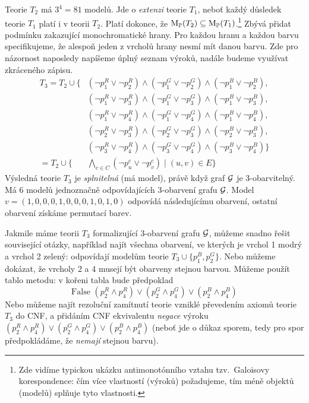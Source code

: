 Teorie \( T_2 \) má \(3^4=81\) modelů. Jde o \emph{extenzi} teorie \( T_1 \), neboť každý důsledek teorie \( T_1 \) platí i v teorii \( T_2 \). Platí dokonce, že \( \operatorname{M}_\mathbb P(T_2)\subseteq\operatorname{M}_\mathbb P(T_1) \).\footnote{Zde vidíme typickou ukázku antimonotónního vztahu tzv.\ Galoisovy korespondence: čím více vlastností (výroků) požadujeme, tím méně objektů (modelů) splňuje tyto vlastnosti.} Zbývá přidat podmínku zakazující monochromatické hrany. Pro každou hranu a každou barvu specifikujeme, že alespoň jeden z vrcholů hrany nesmí mít danou barvu. Zde pro názornost naposledy napíšeme úplný seznam výroků, nadále budeme využívat zkráceného zápisu.
\begin{align*}
    T_3 = T_2\cup \{ & (\neg p_1^R \lor \neg p_2^R) \land (\neg p_1^G \lor \neg p_2^G) \land (\neg p_1^B \lor \neg p_2^B),\\
    & (\neg p_1^R \lor \neg p_3^R) \land (\neg p_1^G \lor \neg p_3^G) \land (\neg p_1^B \lor \neg p_3^B),\\
    & (\neg p_1^R \lor \neg p_4^R) \land (\neg p_1^G \lor \neg p_4^G) \land (\neg p_1^B \lor \neg p_4^B),\\
    & (\neg p_2^R \lor \neg p_3^R) \land (\neg p_2^G \lor \neg p_3^G) \land (\neg p_2^B \lor \neg p_3^B),\\
    & (\neg p_3^R \lor \neg p_4^R) \land (\neg p_3^G \lor \neg p_4^G) \land (\neg p_3^B \lor \neg p_4^B)\} \\  
= T_2\cup \{ &\bigwedge_{c\in C} 
(\neg p_u^c \lor \neg p_v^c) \mid (u,v) \in E \}
\end{align*}
Výsledná teorie \( T_3 \) je \emph{splnitelná} (má model), právě když graf \( \mathcal{G} \) je 3-obarvitelný. Má 6 modelů jednoznačně odpovídajících 3-obarvení grafu \( \mathcal{G} \). Model \( v = (1,0,0,0,1,0,0,0,1,0,1,0) \) odpovídá následujícímu obarvení, ostatní obarvení získáme permutací barev.
\begin{center}
\end{center}

Jakmile máme teorii \(T_3\) formalizující 3-obarvení grafu \( \mathcal{G} \), můžeme snadno řešit související otázky, například najít všechna obarvení, ve kterých je vrchol 1 modrý a vrchol 2 zelený: odpovídají modelům teorie \( T_3 \cup \{ p_1^B, p_2^G\} \). Nebo můžeme dokázat, že vrcholy 2 a 4 musejí být obarveny stejnou barvou. Můžeme použít tablo metodu: v kořeni tabla bude předpoklad
\[
\text{False  }(p_2^R \land p_4^R)\lor(p_2^G \land p_4^G)\lor(p_2^B \land p_4^B)
\]
Nebo můžeme najít rezoluční zamítnutí teorie vzniklé převedením axiomů teorie \( T_3 \) do CNF, a přidáním CNF ekvivalentu \emph{negace} výroku \( (p_2^R \land p_4^R)\lor(p_2^G \land p_4^G)\lor(p_2^B \land p_4^B) \)	(neboť jde o důkaz sporem, tedy pro spor předpokládáme, že \emph{nemají} stejnou barvu).



